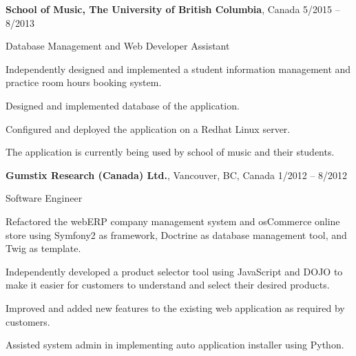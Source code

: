 \documentclass[10pt]{article}
\newcommand{\halfblankline}{\quad\vspace{-0.5\baselineskip}\pagebreak[3]}
\begin{document}
\textbf{School of Music, The University of British Columbia}, Canada \hfill 	5/2015 -- 8/2013
\begin{outerlist}
\item[] Database Management and Web Developer Assistant
\begin{innerlist}
\item Independently designed and implemented a student information management and practice room hours booking system.
\item Designed and implemented database of the application. 
\item Configured and deployed the application on a Redhat Linux server.
\item The application is currently being used by school of music and their students.
\end{innerlist}
\end{outerlist}

\halfblankline

\textbf{Gumstix Research (Canada) Ltd.}, Vancouver, BC, Canada \hfill 	1/2012 -- 8/2012
\begin{outerlist}
\item[] Software Engineer
\begin{innerlist}
\item Refactored the webERP company management system and osCommerce online store using Symfony2 as framework, Doctrine as database management tool, and Twig as template.
\item Independently developed a product selector tool using JavaScript and DOJO to make it easier for customers to understand and select their desired products.
\item Improved and added new features to the existing web application as required by customers.
\item Assisted system admin in implementing auto application installer using Python.
\end{innerlist}
\end{outerlist}
\end{document}
